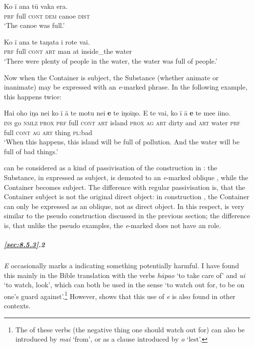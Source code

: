 \ea\label{ex:8.63}
\gll Ko {\ꞌ}ī {\ꞌ}ana tū vaka era. \\
\textsc{prf} full \textsc{cont} \textsc{dem} canoe \textsc{dist} \\

\glt 
‘The canoe was full.’ \textstyleExampleref{[R615.716]} 
\z

\ea\label{ex:8.64}
\gll Ko {\ꞌ}ī {\ꞌ}ana te taŋata {\ꞌ}i rote vai. \\
\textsc{prf} full \textsc{cont} \textsc{art} man at inside\_the water \\

\glt
‘There were plenty of people in the water, the water was full of people.’ \textstyleExampleref{[R210.166]} 
\z

Now when the Container is subject, the Substance (whether animate or inanimate) may be expressed with an \textit{e}{}-marked phrase. In the following example, this happens twice:

\ea\label{ex:8.65}
\gll Hai oho iŋa nei ko {\ꞌ}ī {\ꞌ}ā te motu nei \textbf{e} te iŋoiŋo. {\ꞌ}E te vai, ko {\ꞌ}ī {\ꞌ}ā \textbf{e} te me{\ꞌ}e {\ꞌ}i{\ꞌ}ino. \\
\textsc{ins} go \textsc{nmlz} \textsc{prox} \textsc{prf} full \textsc{cont} \textsc{art} island \textsc{prox} \textsc{ag} \textsc{art} dirty and \textsc{art} water \textsc{prf} full \textsc{cont} \textsc{ag} \textsc{art} thing \textsc{pl}:bad \\

\glt
‘When this happens, this island will be full of pollution. And the water will be full of bad things.’ \textstyleExampleref{[R649.119]} 
\z

 can be considered as a kind of passivisation of the construction in : the Substance, in  expressed as subject, is demoted to an \textit{e}{}-marked oblique , while the Container becomes subject. The difference with regular passivisation is, that the Container subject is not the original direct object: in construction , the Container can only be expressed as an oblique, not as direct object. In this respect,  is very similar to the pseudo construction discussed in the previous section; the difference is, that unlike the pseudo examples, the \textit{e}{}-marked  does not have an  role.

\subparagraph{\ref{sec:8.5.3}.2} \textit{E} occasionally marks a  indicating something potentially harmful. I have found this mainly in the Bible translation with the verbs \textit{\mbox{hāpa{\ꞌ}o}} ‘to take care of’ and \textit{u{\ꞌ}i} ‘to watch, look’, which can both be used in the sense ‘to watch out for, to be on one’s guard against’.\footnote{\label{fn:418}The  of these verbs (the negative thing one should watch out for) can also be introduced by \textit{mai} ‘from’, or as a clause introduced by \textit{{\ꞌ}o} ‘lest’.} However,  shows that this use of \textit{e} is also found in other contexts. 

